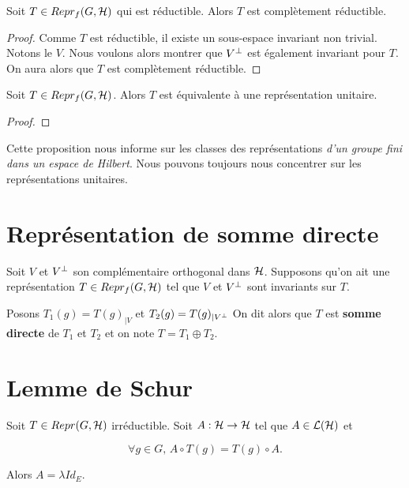 \begin{proposition}
	Soit $T \in Repr_{f}(G, \mathcal{H})$ qui est réductible. Alors $T$ est
	complètement réductible.
\end{proposition}

\begin{proof}
	Comme $T$ est réductible, il existe un sous-espace invariant non trivial.
	Notons le $V$.
	Nous voulons alors montrer que $V^{\perp}$ est également invariant pour
	$T$. On aura alors que $T$ est complètement réductible.
\end{proof}

\begin{proposition}
	Soit $T \in Repr_{f}(G, \mathcal{H})$. Alors $T$ est équivalente à une
	représentation unitaire.
\end{proposition}

\begin{proof}
	
\end{proof}

Cette proposition nous informe sur les classes des représentations \textit{d'un groupe
fini dans un espace de Hilbert}. Nous pouvons toujours nous concentrer sur les
représentations unitaires.

\section{Représentation de somme directe}

\begin{definition}
	Soit $V$ et $V^{\perp}$ son complémentaire orthogonal dans $\mathcal{H}$.
	Supposons qu'on ait une représentation $T \in Repr_{f}(G, \mathcal{H})$ tel que
	$V$ et $V^{\perp}$ sont invariants sur $T$.

	Posons $T_{1}(g) = T(g)_{|V}$ et $T_{2}(g) = T(g)_{|V^{\perp}}$
	On dit alors que $T$ est \textbf{somme directe} de $T_{1}$ et $T_{2}$ et on
	note $T = T_{1} \oplus T_{2}$.
\end{definition}

\section{Lemme de Schur}

\begin{proposition} 
	\label{shur_lemma_1}
	Soit $T \in Repr(G, \mathcal{H})$ irréductible.
	Soit $A : \mathcal{H} \rightarrow \mathcal{H}$
	tel que $A \in \mathcal{L}(\mathcal{H})$ et

	\begin{equation}
		\forall g \in G, \, A \circ T(g) = T(g) \circ A.
	\end{equation}

	Alors $A = \lambda Id_{E}$.
\end{proposition}
